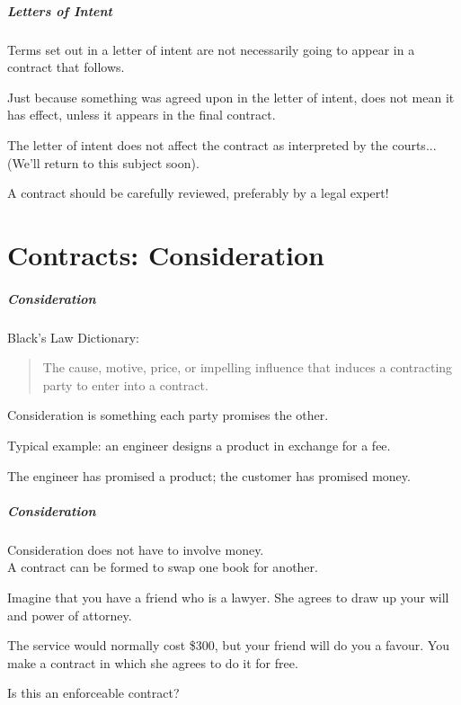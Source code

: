 \begin{frame}
\frametitle{Letters of Intent}

Terms set out in a letter of intent are not necessarily going to appear in a contract that follows.

Just because something was agreed upon in the letter of intent, does not mean it has effect, unless it appears in the final contract.

The letter of intent does not affect the contract as interpreted by the courts...\\
\quad(We'll return to this subject soon).

A contract should be carefully reviewed, preferably by a legal expert!


\end{frame}


\part{Contracts: Consideration}

\begin{frame}
\partpage
\end{frame}



\begin{frame}
\frametitle{Consideration}

Black's Law Dictionary:
\begin{quote}
	The cause, motive, price, or impelling influence that induces a contracting party to enter into a contract.
\end{quote}

\alert{Consideration} is something each party promises the other.

Typical example: an engineer designs a product in exchange for a fee.

The engineer has promised a product; the customer has promised money.

\end{frame}



\begin{frame}
\frametitle{Consideration}

Consideration does not have to involve money.\\
\quad A contract can be formed to swap one book for another.

Imagine that you have a friend who is a lawyer. She agrees to draw up your will and power of attorney. 

The service would normally cost \$300, but your friend will do you a favour. You make a contract in which she agrees to do it for free.

Is this an enforceable contract?

\end{frame}



